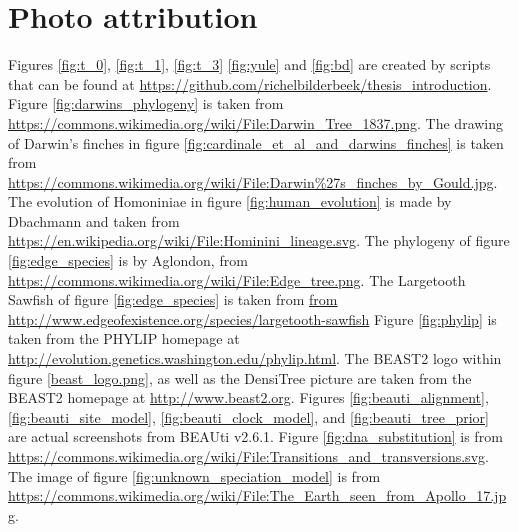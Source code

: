 \section{Photo attribution}

Figures \ref{fig:t_0}, \ref{fig:t_1}, \ref{fig:t_3} 
\ref{fig:yule} and \ref{fig:bd} are created by
scripts that can be found at \url{https://github.com/richelbilderbeek/thesis_introduction}.
Figure \ref{fig:darwins_phylogeny} is taken from \url{https://commons.wikimedia.org/wiki/File:Darwin_Tree_1837.png}.
The drawing of Darwin's finches in figure \ref{fig:cardinale_et_al_and_darwins_finches}
is taken from \url{https://commons.wikimedia.org/wiki/File:Darwin%27s_finches_by_Gould.jpg}.
The evolution of Homoniniae in figure \ref{fig:human_evolution} is made by Dbachmann 
and taken from \url{https://en.wikipedia.org/wiki/File:Hominini_lineage.svg}.
The phylogeny of figure \ref{fig:edge_species} 
is by Aglondon, from \url{https://commons.wikimedia.org/wiki/File:Edge_tree.png}.
The Largetooth Sawfish of figure \ref{fig:edge_species}
is taken from \url{from http://www.edgeofexistence.org/species/largetooth-sawfish}
Figure \ref{fig:phylip} is taken from the PHYLIP homepage at \url{http://evolution.genetics.washington.edu/phylip.html}.
The BEAST2 logo within figure \ref{beast_logo.png},
as well as the DensiTree picture are 
taken from the BEAST2 homepage at \url{http://www.beast2.org}.
Figures \ref{fig:beauti_alignment},
\ref{fig:beauti_site_model},
\ref{fig:beauti_clock_model},
and \ref{fig:beauti_tree_prior}
are actual screenshots from BEAUti v2.6.1.
Figure \ref{fig:dna_substitution} is from \url{https://commons.wikimedia.org/wiki/File:Transitions_and_transversions.svg}.
The image of figure \ref{fig:unknown_speciation_model}
is from \url{https://commons.wikimedia.org/wiki/File:The_Earth_seen_from_Apollo_17.jpg}.

